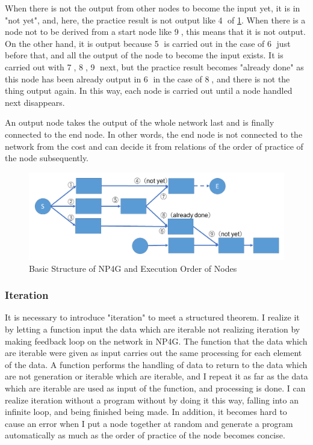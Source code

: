 \documentclass{article}
\begin{document}
When there is not the output from other nodes to become the input yet, it is in "not yet", and, here, the practice result is not output like \textcircled{\scriptsize 4} of \ref{fig:sequence}.
When there is a node not to be derived from a start node like \textcircled{\scriptsize 9}, this means that it is not output.
On the other hand, it is output because \textcircled{\scriptsize 5} is carried out in the case of \textcircled{\scriptsize 6} just before that, and all the output of the node to become the input exists.
It is carried out with \textcircled{\scriptsize 7}, \textcircled{\scriptsize 8}, \textcircled{\scriptsize 9} next, but the practice result becomes "already done" as this node has been already output in \textcircled{\scriptsize 6} in the case of \textcircled{\scriptsize 8}, and there is not the thing output again.
In this way, each node is carried out until a node handled next disappears.

An output node takes the output of the whole network last and is finally connected to the end node.
In other words, the end node is not connected to the network from the cost and can decide it from relations of the order of practice of the node subsequently.

\begin{figure}[t]
\begin{center}
\includegraphics[width=130mm]{sequence.png}
\end{center}
\caption{Basic Structure of NP4G and Execution Order of Nodes}
\label{fig:sequence}
\end{figure}

\subsubsection {Iteration}
It is necessary to introduce "iteration" to meet a structured theorem.
I realize it by letting a function input the data which are iterable not realizing iteration by making feedback loop on the network in NP4G.
The function that the data which are iterable were given as input carries out the same processing for each element of the data.
A function performs the handling of data to return to the data which are not generation or iterable which are iterable, and I repeat it as far as the data which are iterable are used as input of the function, and processing is done.
I can realize iteration without a program without by doing it this way, falling into an infinite loop, and being finished being made.
In addition, it becomes hard to cause an error when I put a node together at random and generate a program automatically as much as the order of practice of the node becomes concise.
\end{document}
